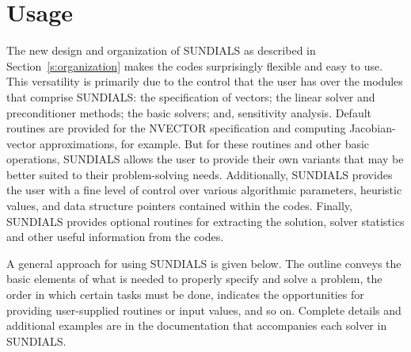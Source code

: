 \section{Usage} 
\label{s:usage}

The new design and organization of SUNDIALS 
as described in Section~\ref{s:organization}
makes the codes surprisingly flexible and easy to use.
This versatility is primarily due to the control that the user has
over the modules that comprise SUNDIALS: the specification of vectors;
the linear solver and preconditioner methods; the basic solvers; and,
sensitivity analysis.
Default routines are provided for the NVECTOR specification and
computing Jacobian-vector approximations, for example. But for these
routines and other basic operations, SUNDIALS allows the user to provide
their own variants that may be better suited to their problem-solving
needs. 
Additionally, SUNDIALS provides the user with a fine level of control
over various algorithmic parameters, heuristic values, and data
structure pointers contained within the codes.
Finally, SUNDIALS provides optional routines for extracting the
solution, solver statistics and other useful information from the codes.

A general approach for using SUNDIALS is given below. 
The outline conveys the basic elements of what is needed to properly
specify and solve a problem, the order in which certain tasks must be
done, indicates the opportunities for providing user-supplied
routines or input values, and so on.
Complete details and additional examples are in the documentation that
accompanies each solver in SUNDIALS.

